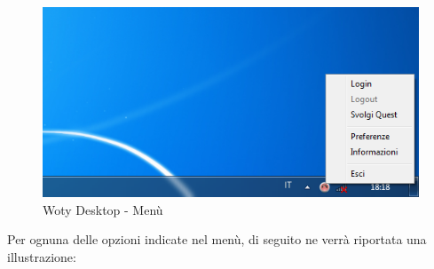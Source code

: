 \begin{center}
\begin{figure}[H]
\centering
\includegraphics[scale=0.6]{images/wotyDesktop/schreenshots/menu.png}
\caption{Woty Desktop - Menù}
\label{wd-menu}
\end{figure}
\end{center}

Per ognuna delle opzioni indicate nel menù, di seguito ne verrà riportata una illustrazione:

